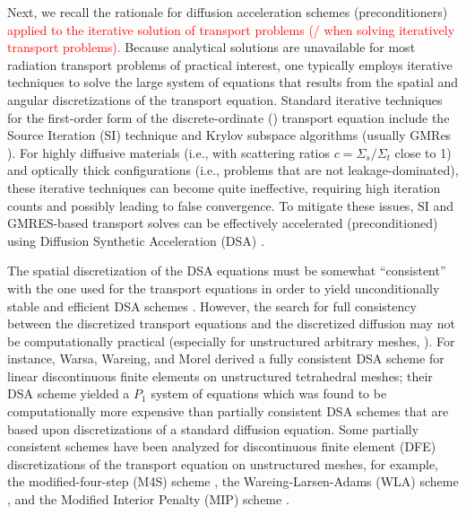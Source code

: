 
Next, we recall the rationale for diffusion acceleration schemes (preconditioners) 
\textcolor{red}{applied to the iterative solution of
transport problems (/ when solving iteratively transport problems).}
Because analytical solutions are unavailable for most
radiation transport problems of practical interest, one typically employs
iterative techniques to solve the large system of equations that results from
the spatial and angular discretizations of the transport equation. Standard
iterative techniques for the first-order form of the discrete-ordinate (\sn)
transport equation include the Source Iteration (SI) technique and Krylov 
subspace algorithms (usually GMRes \cite{gmres}). For highly diffusive materials 
(i.e., with scattering ratios $c=\Sigma_s / \Sigma_t $ close to 1) and optically 
thick configurations (i.e., problems that are not leakage-dominated), these iterative techniques 
can become quite ineffective, requiring high iteration counts and possibly 
leading to false convergence. To mitigate these issues, SI and GMRES-based transport solves 
can be effectively accelerated (preconditioned) using Diffusion Synthetic Acceleration (DSA) 
\cite{dsa_ref,larsen_dsa,consistent_p1,m4s,wla,mip}. 

The spatial discretization of the DSA equations
must be somewhat ``consistent'' with the one used for the \sn transport equations 
in order to yield unconditionally stable and efficient DSA schemes
\cite{dsa_ref,larsen_dsa,consistent_p1,m4s,wla,mip}. However, the search for full
consistency between the discretized transport equations and the discretized
diffusion may not be computationally practical (especially for unstructured
arbitrary meshes, \cite{dsa_ref}). For instance, Warsa, Wareing, and
Morel \cite{consistent_p1} derived a fully consistent DSA scheme for linear
discontinuous finite elements on unstructured tetrahedral meshes; their DSA
scheme yielded a $P_1$ system of equations which was found to be
computationally more expensive than partially consistent DSA schemes that are
based upon discretizations of a standard diffusion equation. Some partially 
consistent schemes have been analyzed for discontinuous finite element
(DFE) discretizations of the transport equation on unstructured meshes, for
example, the modified-four-step (M4S) scheme \cite{m4s}, the
Wareing-Larsen-Adams (WLA) scheme \cite{wla}, and the Modified Interior
Penalty (MIP) scheme \cite{mip}.

